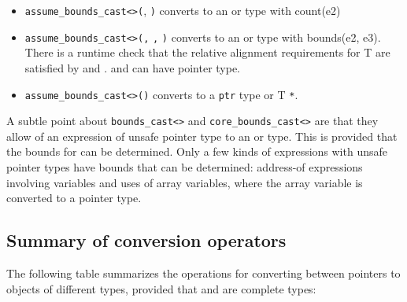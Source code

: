\begin{itemize}
\item
  \texttt{assume\_bounds\_cast\textless{}}\texttt{\textgreater{}(},
  \texttt{)} converts  to an \arrayptr or
  \arrayview type with count(e2)
\item
  \texttt{assume\_bounds\_cast\textless{}}\texttt{\textgreater{}(}\texttt{,}
  \texttt{,} \texttt{)} converts  to an
  \arrayptr or \arrayview type with bounds(e2, e3).
  There is a runtime check that the relative alignment requirements for
  T are satisfied by   and .  and
   can have pointer type.
\item
  \texttt{assume\_bounds\_cast\textless{}}\texttt{\textgreater{}(}\texttt{)}
  converts  to a \texttt{ptr} type or T \texttt{*}.
\end{itemize}

A subtle point about
\texttt{bounds\_cast\textless{}}\texttt{\textgreater{}} and
\texttt{core\_bounds\_cast\textless{}}\texttt{\textgreater{}}
are that they allow  of an expression
 of unsafe pointer type to an \arrayview or
\arrayptr type. This is provided that the bounds for 
can be determined. Only a few kinds of expressions with unsafe pointer
types have bounds that can be determined: address-of expressions
involving variables and uses of array variables, where the array
variable is converted to a pointer type.

\subsection{Summary of conversion operators}

The following table summarizes the operations for converting between
pointers to objects of different types, provided that  and  are
complete types:

\newcommand{\boundscast}[2]{\texttt{bounds\_cast<#1>#2}}
\newcommand{\coreboundscast}[2]{\texttt{core\_bounds\_cast<#1>#2}}
\newcommand{\assumeboundscast}[2]{\texttt{assume\_bounds\_cast<#1>#2}}


